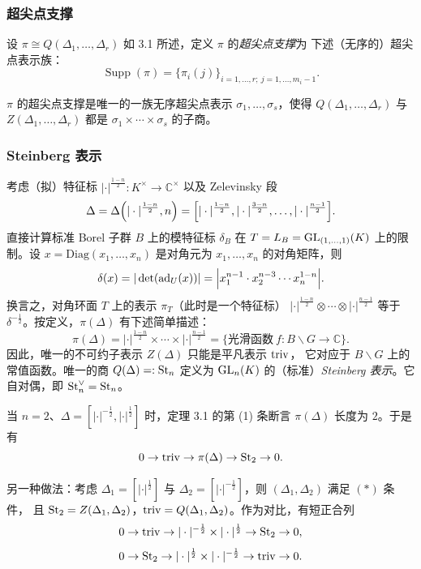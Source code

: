 \subsubsection{超尖点支撑}

\begin{definition}
设 $\pi\cong Q(\Delta_1,\dots,\Delta_r)$ 如 3.1 所述，定义 $\pi$ 的\emph{超尖点支撑}为
下述（无序的）超尖点表示族：
\[
\operatorname{Supp}(\pi)=\bigl\{\pi_i(j)\bigr\}_{i=1,\dots,r;\ j=1,\dots,m_i-1}.
\]
\end{definition}

\begin{remark}[Zelevinsky]
$\pi$ 的超尖点支撑是唯一的一族无序超尖点表示 $\sigma_1,\dots,\sigma_s$，使得
$Q(\Delta_1,\dots,\Delta_r)$ 与 $Z(\Delta_1,\dots,\Delta_r)$ 都是
$\sigma_1\times\cdots\times\sigma_s$ 的子商。
\end{remark}

\subsubsection{Steinberg 表示}

考虑（拟）特征标 $|\cdot|^{\frac{1-n}{2}}\colon K^{\times}\to\mathbb{C}^{\times}$
以及 Zelevinsky 段
\[
\Delta=\Delta\Bigl(|\cdot|^{\frac{1-n}{2}},n\Bigr)
=\Bigl[|\cdot|^{\frac{1-n}{2}},|\cdot|^{\frac{3-n}{2}},\dots,|\cdot|^{\frac{n-1}{2}}\Bigr].
\]
直接计算标准 Borel 子群 $B$ 上的模特征标 $\delta_B$ 在 $T=L_B=\mathrm{GL}_{(1,\dots,1)}(K)$
上的限制。设 $x=\mathrm{Diag}(x_1,\dots,x_n)$ 是对角元为 $x_1,\dots,x_n$ 的对角矩阵，则
\[
\delta(x)=|\det(\mathrm{ad}_U(x))|
=\Bigl|x_1^{n-1}\cdot x_2^{n-3}\cdots x_n^{1-n}\Bigr|.
\]
换言之，对角环面 $T$ 上的表示 $\pi_T$（此时是一个特征标）
$|\cdot|^{\frac{1-n}{2}}\otimes\cdots\otimes|\cdot|^{\frac{n-1}{2}}$ 等于
$\delta^{-\frac12}$。按定义，$\pi(\Delta)$ 有下述简单描述：
\[
\pi(\Delta)=|\cdot|^{\frac{1-n}{2}}\times\cdots\times|\cdot|^{\frac{n-1}{2}}
=\bigl\{\text{光滑函数}\ f\colon B\backslash G\to\mathbb{C}\bigr\}.
\]
因此，唯一的不可约子表示 $Z(\Delta)$ 只能是平凡表示 $\mathrm{triv}$，
它对应于 $B\backslash G$ 上的常值函数。唯一的商 $Q(\Delta)=:\mathrm{St}_n$ 定义为
$\mathrm{GL}_n(K)$ 的（标准）\emph{Steinberg 表示}。它自对偶，即 $\mathrm{St}_n^{\vee}=\mathrm{St}_n$。

\begin{remark}
当 $n=2$、$\Delta=[|\cdot|^{-\frac12},|\cdot|^{\frac12}]$ 时，定理 3.1 的第 (1) 条断言
$\pi(\Delta)$ 长度为 $2$。于是有
\[
0\to\mathrm{triv}\to\pi(\Delta)\to\mathrm{St}_2\to 0 .
\]
\end{remark}

\begin{remark}
另一种做法：考虑 $\Delta_1=[|\cdot|^{\frac12}]$ 与
$\Delta_2=[|\cdot|^{-\frac12}]$，则 $(\Delta_1,\Delta_2)$ 满足 $(*)$ 条件，
且 $\mathrm{St}_2=Z(\Delta_1,\Delta_2)$，$\mathrm{triv}=Q(\Delta_1,\Delta_2)$。作为对比，有短正合列
\[
0\to\mathrm{triv}\to|\cdot|^{-\frac12}\times|\cdot|^{\frac12}\to\mathrm{St}_2\to 0,
\]
\[
0\to\mathrm{St}_2\to|\cdot|^{\frac12}\times|\cdot|^{-\frac12}\to\mathrm{triv}\to 0 .
\]
\end{remark}

